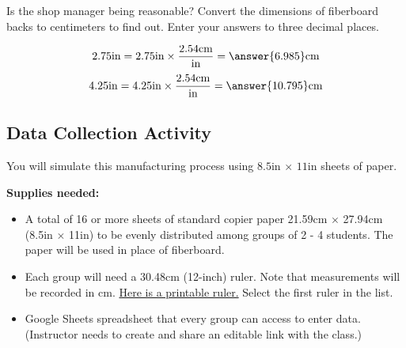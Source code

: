 \documentclass{ximera}
\begin{document}
\begin{question}\label{quest:qc150_3}
    Is the shop manager being reasonable?  Convert the  dimensions of fiberboard backs to centimeters to find out.  Enter your answers to three decimal places.

    $$2.75\text{in}=2.75\text{in}\times \frac{2.54\text{cm}}{\text{in}}=\answer{6.985}\text{cm}$$
    $$4.25\text{in}=4.25\text{in}\times \frac{2.54\text{cm}}{\text{in}}=\answer{10.795}\text{cm}$$
\end{question}

\subsection*{Data Collection Activity}
You will simulate this manufacturing process using $8.5$in $\times$ $11$in sheets of paper.

\textbf{Supplies needed:}
\begin{itemize}
\item A total of 16 or more sheets of standard copier paper 21.59cm $\times$ 27.94cm (8.5in $\times$ 11in) to be evenly distributed among groups of 2 - 4 students. The paper will be used in place of fiberboard.  
\item Each group will need a 30.48cm (12-inch) ruler. Note that measurements will be recorded in cm.  \href{http://www.vendian.org/mncharity/dir3/paper_rulers/}{Here is a printable ruler.}  Select the first ruler in the list.
\item Google Sheets spreadsheet that every group can access to enter data.  (Instructor needs to create and share an editable link with the class.)
\end{itemize}
\end{document}
